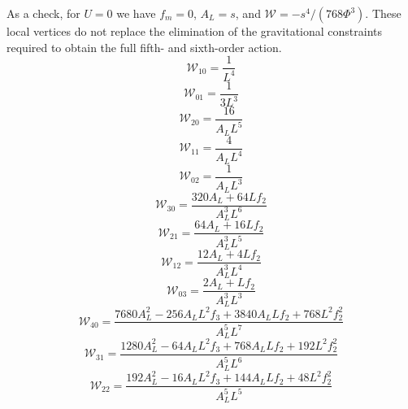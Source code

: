 \documentclass[11pt,a4paper]{article}
\begin{document}
As a check, for $ U=0 $ we have $ f_m=0 $, $ A_L=s $, and $ \mathcal W=-s^4/(768\Phi^3) $. These local vertices do not replace the elimination of the gravitational constraints required to obtain the full fifth- and sixth-order action.
\begin{equation}
\mathcal W_{10}=\frac{1}{L^{4}}
\label{eq:cat-local-W-1-0}
\end{equation}
\begin{equation}
\mathcal W_{01}=\frac{1}{3 L^{3}}
\label{eq:cat-local-W-0-1}
\end{equation}
\begin{equation}
\mathcal W_{20}=\frac{16}{A_{L} L^{5}}
\label{eq:cat-local-W-2-0}
\end{equation}
\begin{equation}
\mathcal W_{11}=\frac{4}{A_{L} L^{4}}
\label{eq:cat-local-W-1-1}
\end{equation}
\begin{equation}
\mathcal W_{02}=\frac{1}{A_{L} L^{3}}
\label{eq:cat-local-W-0-2}
\end{equation}
\begin{equation}
\mathcal W_{30}=\frac{320 A_{L} + 64 L f_{2}}{A_{L}^{3} L^{6}}
\label{eq:cat-local-W-3-0}
\end{equation}
\begin{equation}
\mathcal W_{21}=\frac{64 A_{L} + 16 L f_{2}}{A_{L}^{3} L^{5}}
\label{eq:cat-local-W-2-1}
\end{equation}
\begin{equation}
\mathcal W_{12}=\frac{12 A_{L} + 4 L f_{2}}{A_{L}^{3} L^{4}}
\label{eq:cat-local-W-1-2}
\end{equation}
\begin{equation}
\mathcal W_{03}=\frac{2 A_{L} + L f_{2}}{A_{L}^{3} L^{3}}
\label{eq:cat-local-W-0-3}
\end{equation}
\begin{equation}
\mathcal W_{40}=\frac{7680 A_{L}^{2} - 256 A_{L} L^{2} f_{3} + 3840 A_{L} L f_{2} + 768 L^{2} f_{2}^{2}}{A_{L}^{5} L^{7}}
\label{eq:cat-local-W-4-0}
\end{equation}
\begin{equation}
\mathcal W_{31}=\frac{1280 A_{L}^{2} - 64 A_{L} L^{2} f_{3} + 768 A_{L} L f_{2} + 192 L^{2} f_{2}^{2}}{A_{L}^{5} L^{6}}
\label{eq:cat-local-W-3-1}
\end{equation}
\begin{equation}
\mathcal W_{22}=\frac{192 A_{L}^{2} - 16 A_{L} L^{2} f_{3} + 144 A_{L} L f_{2} + 48 L^{2} f_{2}^{2}}{A_{L}^{5} L^{5}}
\label{eq:cat-local-W-2-2}
\end{equation}
\end{document}
